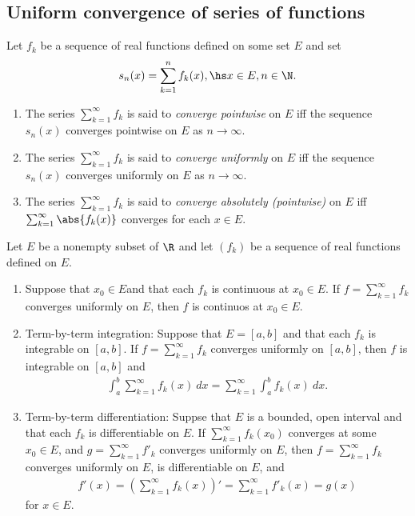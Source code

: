 \documentclass{article}
\begin{document}
\subsection{Uniform convergence of series of functions}

\begin{definition}[Notes 2.3]
	Let $f_k$ be a sequence of real functions defined on some set $E$ and set
	\begin{align*}
		s_n(x) = \sum_{k=1}^n f_k(x),\hs x\in E,n\in\N.
	\end{align*}
	\begin{enumerate}
		\item The series $\sum_{k=1}^\infty f_k$ is said to \emph{converge pointwise} on $E$ iff
		      the sequence $s_n(x)$ converges pointwise on $E$ as $n\to\infty$.
		\item The series $\sum_{k=1}^\infty f_k$ is said to \emph{converge uniformly} on $E$ iff
		      the sequence $s_n(x)$ converges uniformly on $E$ as $n\to\infty$.
		\item The series $\sum_{k=1}^\infty f_k$ is said to \emph{converge absolutely (pointwise)} on $E$ iff
		      $\sum_{k=1}^\infty \abs{f_k(x)}$ converges for each $x\in E$.
	\end{enumerate}
\end{definition}

\begin{theorem}[Notes 2.4]
	Let $E$ be a nonempty subset of $\R$ and let $(f_k)$ be a sequence of real functions defined on $E$.
	\begin{enumerate}
		\item Suppose that $x_0\in E$and that each $f_k$ is continuous at $x_0\in E$.
		      If $f=\sum_{k=1}^\infty f_k$ converges uniformly on $E$, then $f$ is continuos at $x_0\in E$.
		\item Term-by-term integration: Suppose that $E=[a,b]$ and that each $f_k$ is integrable on $[a,b]$.
		      If $f=\sum_{k=1}^\infty f_k$ converges uniformly on $[a,b]$, then $f$ is integrable on $[a,b]$
		      and \begin{align*}
			      \int_a^b \sum_{k=1}^\infty f_k(x)\:dx = \sum_{k=1}^\infty \int_a^b f_k(x)\:dx.
		      \end{align*}
		\item Term-by-term differentiation: Suppse that $E$ is a bounded, open interval and that each
		      $f_k$ is differentiable on $E$. If $\sum_{k=1}^\infty f_k(x_0)$ converges at some $x_0\in E$,
		      and $g=\sum_{k=1}^\infty f'_k$ converges uniformly on $E$, then $f=\sum_{k=1}^\infty f_k$
		      converges uniformly on $E$, is differentiable on $E$, and \begin{align*}
			      f'(x) = \left(\sum_{k=1}^\infty f_k(x)\right)' = \sum_{k=1}^\infty f'_k(x)= g(x)
		      \end{align*}
		      for $x\in E$.
	\end{enumerate}
\end{theorem}
\end{document}
